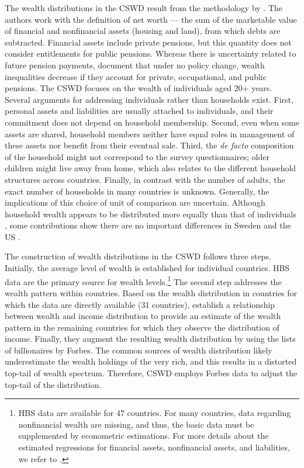 \begin{refsection}
The wealth distributions in the \ac{CSWD} result from the methodology by \textcite{daviesetal2017}. The authors work with the definition of net worth --- the sum of the marketable value of financial and nonfinancial assets (housing and land), from which debts are subtracted. Financial assets include private pensions, but this quantity does not consider entitlements for public pensions. Whereas there is uncertainty related to future pension payments, \textcite{bonke2017} document that under no policy change, wealth inequalities decrease if they account for private, occupational, and public pensions. The \ac{CSWD} focuses on the wealth of individuals aged 20+ years. Several arguments for addressing individuals rather than households exist. First, personal assets and liabilities are usually attached to individuals, and their commitment does not depend on household membership. Second, even when some assets are shared, household members neither have equal roles in management of these assets nor benefit from their eventual sale. Third, the \textit{de facto} composition of the household might not correspond to the survey questionnaires; older children might live away from home, which also relates to the different household structures across countries. Finally, in contrast with the number of adults, the exact number of households in many countries is unknown. Generally, the implications of this choice of unit of comparison are uncertain. Although household wealth appears to be distributed more equally than that of individuals \textcite{atkinson2007top}, some contributions show there are no important differences in Sweden and the \ac{US} \parencite{roine2009wealth,kopczuksaez2004}. 

The construction of wealth distributions in the \ac{CSWD} follows three steps. Initially, the average level of wealth is established for individual countries. \ac{HBS} data are the primary source for wealth levels.\footnote{\ac{HBS} data are available for 47 countries. For many countries, data regarding nonfinancial wealth are missing, and thus, the basic data must be supplemented by econometric estimations. For more details about the estimated regressions for financial assets, nonfinancial assets, and liabilities, we refer to \textcite{daviesetal2017}.} The second step addresses the wealth pattern within countries. Based on the wealth distribution in countries for which the data are directly available (31 countries), \textcite{daviesetal2017} establish a relationship between wealth and income distribution to provide an estimate of the wealth pattern in the remaining countries for which they observe the distribution of income. Finally, they augment the resulting wealth distribution by using the lists of billionaires by Forbes. The common sources of wealth distribution likely underestimate the wealth holdings of the very rich, and this results in a distorted top-tail of wealth spectrum. Therefore, \ac{CSWD} employs Forbes data to adjust the top-tail of the distribution.
%
%
%
%
%

\end{refsection}
